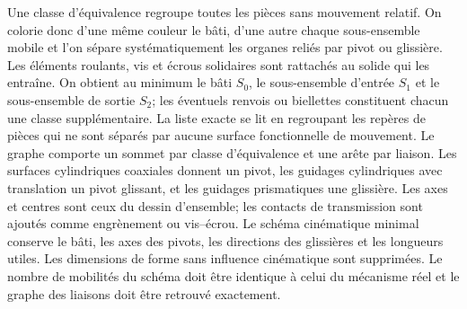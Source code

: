 \begin{corrigebox}
Une classe d'équivalence regroupe toutes les pièces sans mouvement relatif. On colorie donc d'une même couleur le bâti, d'une autre chaque sous-ensemble mobile et l'on sépare systématiquement les organes reliés par pivot ou glissière. Les éléments roulants, vis et écrous solidaires sont rattachés au solide qui les entraîne.
On obtient au minimum le bâti $S_0$, le sous-ensemble d'entrée $S_1$ et le sous-ensemble de sortie $S_2$; les éventuels renvois ou biellettes constituent chacun une classe supplémentaire. La liste exacte se lit en regroupant les repères de pièces qui ne sont séparés par aucune surface fonctionnelle de mouvement.
Le graphe comporte un sommet par classe d'équivalence et une arête par liaison. Les surfaces cylindriques coaxiales donnent un pivot, les guidages cylindriques avec translation un pivot glissant, et les guidages prismatiques une glissière. Les axes et centres sont ceux du dessin d'ensemble; les contacts de transmission sont ajoutés comme engrènement ou vis--écrou.
Le schéma cinématique minimal conserve le bâti, les axes des pivots, les directions des glissières et les longueurs utiles. Les dimensions de forme sans influence cinématique sont supprimées. Le nombre de mobilités du schéma doit être identique à celui du mécanisme réel et le graphe des liaisons doit être retrouvé exactement.
\end{corrigebox}
